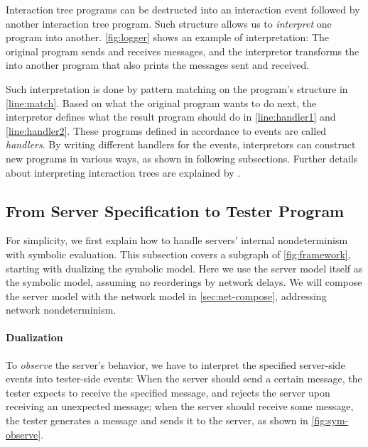 Interaction tree programs can be destructed into an interaction event followed
by another interaction tree program.  Such structure allows us to {\em
  interpret} one program into another.  \autoref{fig:logger} shows an example of
interpretation: The original  program sends and receives messages, and
the  interpretor transforms the  into another program that
also prints the messages sent and received.

Such interpretation is done by pattern matching on the program's structure in
\autoref{line:match}.  Based on what the original program wants to do next, the
interpretor defines what the result program should do in \autoref{line:handler1}
and \autoref{line:handler2}.  These programs defined in accordance to events are
called {\em handlers}.  By writing different handlers for the events,
interpretors can construct new programs in various ways, as shown in following
subsections.  Further details about interpreting interaction trees are explained
by \textcite{itree}.

\subsection{From Server Specification to Tester Program}
\label{sec:derive-internal}

For simplicity, we first explain how to handle servers' internal nondeterminism
with symbolic evaluation.  This subsection covers a subgraph of
\autoref{fig:framework}, starting with dualizing the symbolic model.
Here we use the server model itself as the symbolic model, assuming no
reorderings by network delays.  We will compose the server model with the
network model in \autoref{sec:net-compose}, addressing network nondeterminism.

\paragraph*{Dualization}
To {\em observe} the server's behavior, we have to interpret the specified
server-side events into tester-side events: When the server should send a
certain message, the tester expects to receive the specified message, and
rejects the server upon receiving an unexpected message; when the server should
receive some message, the tester generates a message and sends it to the server,
as shown in \autoref{fig:sym-observe}.

